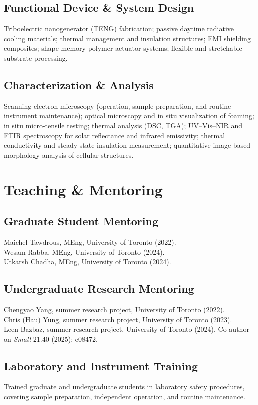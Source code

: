 \documentclass[12pt]{article}
\begin{document}
\subsection{Functional Device \& System Design}
Triboelectric nanogenerator (TENG) fabrication; passive daytime radiative cooling materials; thermal management and insulation structures; EMI shielding composites; shape-memory polymer actuator systems; flexible and stretchable substrate processing.

\subsection{Characterization \& Analysis}
Scanning electron microscopy (operation, sample preparation, and routine instrument maintenance); optical microscopy and in situ visualization of foaming; in situ micro-tensile testing; thermal analysis (DSC, TGA); UV--Vis--NIR and FTIR spectroscopy for solar reflectance and infrared emissivity; thermal conductivity and steady-state insulation measurement; quantitative image-based morphology analysis of cellular structures.

\section{Teaching \& Mentoring}

\subsection{Graduate Student Mentoring}
Maichel Tawdrous, MEng, University of Toronto (2022). \\
Wesam Rabba, MEng, University of Toronto (2024). \\
Utkarsh Chadha, MEng, University of Toronto (2024).

\subsection{Undergraduate Research Mentoring}
Chengyao Yang, summer research project, University of Toronto (2022). \\
Chris (Hau) Yung, summer research project, University of Toronto (2023). \\
Leen Bazbaz, summer research project, University of Toronto (2024). Co-author on \emph{Small} 21.40 (2025): e08472.

\subsection{Laboratory and Instrument Training}
Trained graduate and undergraduate students in laboratory safety procedures, covering sample preparation, independent operation, and routine maintenance.
\end{document}
